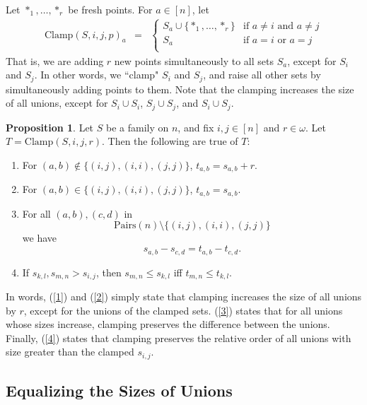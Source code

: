 \documentclass[12pt]{article}
\theoremstyle{definition}
\newtheorem{proposition}{Proposition}
\newcommand{\set}[1]{\{ #1 \}}
\newcommand{\Pairs}{\mbox{Pairs}}
\newcommand{\Update}{\mbox{Clamp}}
\begin{document}
Let $*_1,\ldots, *_r$ be   fresh points.
For $a\in[n]$, let 
\[ \begin{array}{lcl}
\Update(S,i,j,p)_a & = & \left\{
\begin{array}{ll}
S_a \cup \set{*_1,\ldots, *_r} & \mbox{if $a\neq i$ and $a\neq j$}\\
 S_a & \mbox{if $a= i$ or $a = j$}\\
 \end{array}
 \right.
\end{array}
\]
That is, we are adding $r$ new points
simultaneously to all sets $S_a$, except
for $S_i$ and $S_j$.  In other words, we ``clamp" $S_i$ and $S_j$, and raise all other sets
by simultaneously adding points to them.    Note that the clamping increases the size of all unions, except for $S_i\cup S_i$, $S_j \cup S_j$, and $S_i\cup S_j$.


\begin{proposition}
Let $S$ be a family on $n$, and fix $i,j\in[n]$
and $r\in\omega$.
Let $T = \Update(S,i,j,r)$.  Then the following are true of $T$:

\begin{enumerate}
    \item \label{1} For $(a,b)\notin \set{(i,j),(i,i),(j,j)}$, $t_{a,b} = s_{a,b} + r$.
    \item \label{2} For $(a,b)\in \set{(i,j),(i,i),(j,j)}$, $t_{a,b} = s_{a,b}$.
    \item \label{3} For all $(a,b), (c,d)$
    in \[\Pairs(n)\setminus
    \set{(i,j),(i,i),(j,j)} \]
we have 
\[ s_{a,b} - s_{c,d} = t_{a,b} - t_{c,d}.\]

\item \label{4} If $s_{k,l}, s_{m,n} > s_{i,j}$,
then $s_{m,n}\leq s_{k,l}$ iff
 $t_{m,n}\leq t_{k,l}$.

\end{enumerate}

In words, (\ref{1}) and (\ref{2}) simply state that clamping increases the size of all unions by $r$, except for the unions of the clamped sets.  (\ref{3}) states that for all unions whose sizes increase, clamping preserves the difference between the unions.  Finally, (\ref{4}) states that clamping preserves the relative order of all unions with size greater than the clamped $s_{i, j}$.
\end{proposition}


\subsection{Equalizing the Sizes of Unions}
\end{document}
